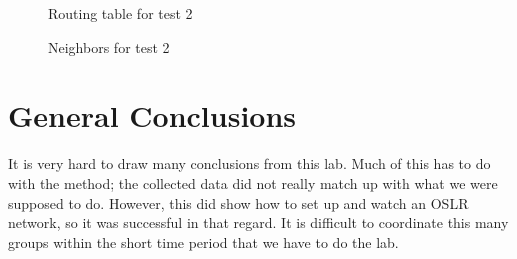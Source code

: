 \documentclass[11pt]{article}
\begin{document}
\begin{figure}[hp]
	\caption{Routing table for test 2}
	\label{rt_2}
\end{figure}

\begin{figure}[hp]
	\caption{Neighbors for test 2}
	\label{n_2}
\end{figure}

\section{General Conclusions}

It is very hard to draw many conclusions from this lab. Much of this has to do with the method; the collected data did not really match up with what we were supposed to do. However, this did show how to set up and watch an OSLR network, so it was successful in that regard. It is difficult to coordinate this many groups within the short time period that we have to do the lab. 
\end{document}
